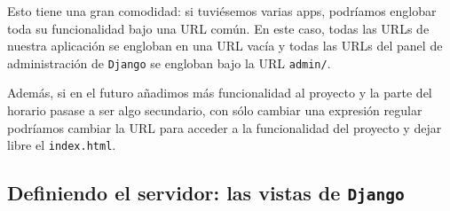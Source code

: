 Esto tiene una gran comodidad: si tuviésemos varias apps, podríamos englobar toda su funcionalidad bajo una URL común. En este caso, todas las URLs de nuestra aplicación se engloban en una URL vacía y todas las URLs del panel de administración de \texttt{Django} se engloban bajo la URL \texttt{admin/}. 

Además, si en el futuro añadimos más funcionalidad al proyecto y la parte del horario pasase a ser algo secundario, con sólo cambiar una expresión regular podríamos cambiar la URL para acceder a la funcionalidad del proyecto y dejar libre el \texttt{index.html}.

\subsection{Definiendo el servidor: las vistas de \texttt{Django}}

